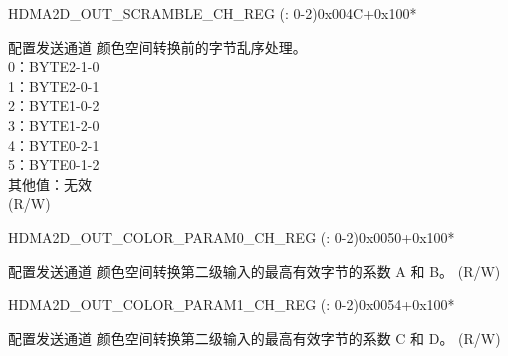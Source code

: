 \begin{register}{H}{DMA2D\_OUT\_SCRAMBLE\_CH\_REG (: 0-2)}{0x004C+0x100*}\label{regdesc:DMA2DOUTSCRAMBLECHNREG}
%
%
\regnewline%
\begin{regdesc}\begin{reglist}
\label{fielddesc:DMA2DOUTSCRAMBLESELPRECHN}\item [DMA2D\_OUT\_SCRAMBLE\_SEL\_PRE\_CH\regindex{n}] 配置发送通道  颜色空间转换前的字节乱序处理。\\
0：BYTE2-1-0\\
1：BYTE2-0-1\\
2：BYTE1-0-2\\
3：BYTE1-2-0\\
4：BYTE0-2-1\\
5：BYTE0-1-2\\
其他值：无效\\ (R/W)
\end{reglist}\end{regdesc}
\end{register}


\begin{register}{H}{DMA2D\_OUT\_COLOR\_PARAM0\_CH\_REG (: 0-2)}{0x0050+0x100*}\label{regdesc:DMA2DOUTCOLORPARAM0CHNREG}
%
%
\regnewline%
\begin{regdesc}\begin{reglist}
\label{fielddesc:DMA2DOUTCOLORPARAMH0CHN}\item [DMA2D\_OUT\_COLOR\_PARAM\_H0\_CH\regindex{n}] 配置发送通道  颜色空间转换第二级输入的最高有效字节的系数 A 和 B。 (R/W)
\end{reglist}\end{regdesc}
\end{register}


\begin{register}{H}{DMA2D\_OUT\_COLOR\_PARAM1\_CH\_REG (: 0-2)}{0x0054+0x100*}\label{regdesc:DMA2DOUTCOLORPARAM1CHNREG}
%
%
\regnewline%
\begin{regdesc}\begin{reglist}
\label{fielddesc:DMA2DOUTCOLORPARAMH1CHN}\item [DMA2D\_OUT\_COLOR\_PARAM\_H1\_CH\regindex{n}] 配置发送通道  颜色空间转换第二级输入的最高有效字节的系数 C 和 D。 (R/W)
\end{reglist}\end{regdesc}
\end{register}


